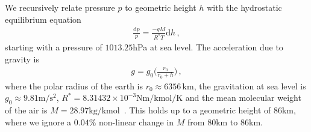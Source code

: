 We recursively relate pressure $p$ to geometric height $h$ with the hydrostatic equilibrium equation
\begin{align}
	\frac{\text{d}p}{p} = \frac{- g M}{R^* T} \text{d} h \, ,\label{eq:hydr}
\end{align}
starting with a pressure of $1013.25$hPa at sea level.
The acceleration due to gravity is
\begin{align}
	g = g_0 \Bigg( \frac{r_0}{r_0 + h} \Bigg) \, ,
\end{align}
where the polar radius of the earth is $r_0 \approx 6356 \, \text{km}$, the gravitation at sea level is $g_0 \approx 9.81 \text{m}/\text{s}^2$, $R^* = 8.31432 \times 10^{-3} \text{Nm} / \text{kmol} / \text{K}$ and the mean molecular weight of the air is $M = 28.97 \text{kg/kmol}$~\cite{atmosphere1976us}.
This holds up to a geometric height of $86$km, where we ignore a $0.04\%$ non-linear change in $M$ from $80$km to $86$km.

